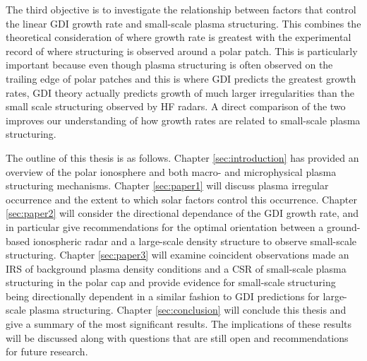 The third objective is to investigate the relationship between factors that control the linear GDI growth rate and small-scale plasma structuring.  This combines the theoretical consideration of where growth rate is greatest with the experimental record of where structuring is observed around a polar patch.  This is particularly important because even though plasma structuring is often observed on the trailing edge of polar patches and this is where GDI predicts the greatest growth rates, GDI theory actually predicts growth of much larger irregularities than the small scale structuring observed by HF radars.  A direct comparison of the two improves our understanding of how growth rates are related to small-scale plasma structuring.

The outline of this thesis is as follows.  Chapter \ref{sec:introduction} has provided an overview of the polar ionosphere and both macro- and microphysical plasma structuring mechanisms.  Chapter \ref{sec:paper1} will discuss plasma irregular occurrence and the extent to which solar factors control this occurrence.  Chapter \ref{sec:paper2} will consider the directional dependance of the GDI growth rate, and in particular give recommendations for the optimal orientation between a ground-based ionospheric radar and a large-scale density structure to observe small-scale structuring.  Chapter \ref{sec:paper3} will examine coincident observations made an IRS of background plasma density conditions and a CSR of small-scale plasma structuring in the polar cap and provide evidence for small-scale structuring being directionally dependent in a similar fashion to GDI predictions for large-scale plasma structuring.  Chapter \ref{sec:conclusion} will conclude this thesis and give a summary of the most significant results.  The implications of these results will be discussed along with questions that are still open and recommendations for future research.




